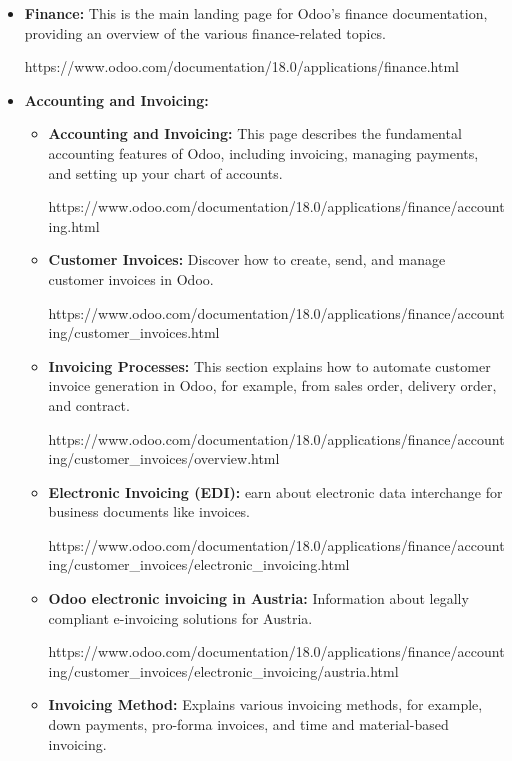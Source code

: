 \documentclass[11pt,a4paper]{article}
\begin{document}
\begin{itemize}
    \item \textbf{Finance:} This is the main landing page for Odoo's finance documentation, providing an overview of the various finance-related topics. 
    
    https://www.odoo.com/documentation/18.0/applications/finance.html

    \item \textbf{Accounting and Invoicing:}
    \begin{itemize}
        \item \textbf{Accounting and Invoicing:} This page describes the fundamental accounting features of Odoo, including invoicing, managing payments, and setting up your chart of accounts. 
        
        https://www.odoo.com/documentation/18.0/applications/finance/accounting.html

        \item \textbf{Customer Invoices:} Discover how to create, send, and manage customer invoices in Odoo. 
        
        https://www.odoo.com/documentation/18.0/applications/finance/accounting/customer\_invoices.html

        \item \textbf{Invoicing Processes:} This section explains how to automate customer invoice generation in Odoo, for example, from sales order, delivery order, and contract. 
        
        https://www.odoo.com/documentation/18.0/applications/finance/accounting/customer\_invoices/overview.html

        \item \textbf{Electronic Invoicing (EDI):} earn about electronic data interchange for business documents like invoices. 
        
        https://www.odoo.com/documentation/18.0/applications/finance/accounting/customer\_invoices/electronic\_invoicing.html

        \item \textbf{Odoo electronic invoicing in Austria:} Information about legally compliant e-invoicing solutions for Austria. 
        
        https://www.odoo.com/documentation/18.0/applications/finance/accounting/customer\_invoices/electronic\_invoicing/austria.html

        \item \textbf{Invoicing Method:} Explains various invoicing methods, for example, down payments, pro-forma invoices, and time and material-based invoicing. 
        

\end{itemize}
\end{itemize}
\end{document}
